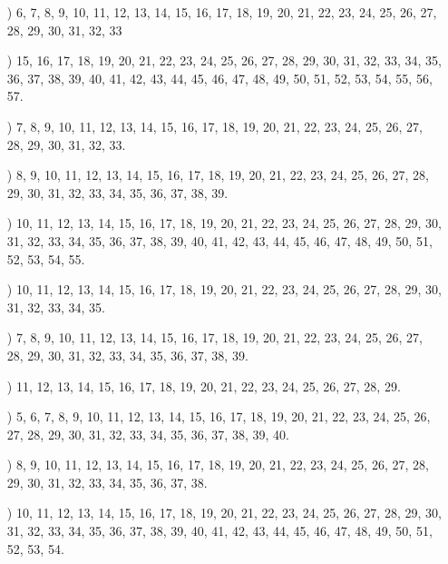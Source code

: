 \documentclass[a4paper,11pt]{article}
\numberwithin{equation}{section}
\begin{document}
\begin{itemize}
\item[ \romannumeral18)] 6, 7, 8, 9, 10, 11, 12, 13, 14, 15, 16, 17, 18, 19,
  20, 21, 22, 23, 24, 25, 26, 27, 28, 29, 30, 31, 32, 33

\item[\romannumeral19)] 15, 16, 17, 18, 19, 20, 21, 22, 23, 24, 25, 26, 27,
  28, 29, 30, 31, 32, 33, 34, 35, 36, 37, 38, 39, 40, 41, 42, 43, 44, 45,
  46, 47, 48, 49, 50, 51, 52, 53, 54, 55, 56, 57.

\item[\romannumeral20)] 7, 8, 9, 10, 11, 12, 13, 14, 15, 16, 17, 18, 19, 20,
  21, 22, 23, 24, 25, 26, 27, 28, 29, 30, 31, 32, 33.

\item[\romannumeral21)] 8, 9, 10, 11, 12, 13, 14, 15, 16, 17, 18, 19, 20,
  21, 22, 23, 24, 25, 26, 27, 28, 29, 30, 31, 32, 33, 34, 35, 36, 37, 38, 39.

\item[\romannumeral22)] 10, 11, 12, 13, 14, 15, 16, 17, 18, 19, 20, 21, 22,
  23, 24, 25, 26, 27, 28, 29, 30, 31, 32, 33, 34, 35, 36, 37, 38, 39, 40,
  41, 42, 43, 44, 45, 46, 47, 48, 49, 50, 51, 52, 53, 54, 55.

\item[\romannumeral23)] 10, 11, 12, 13, 14, 15, 16, 17, 18, 19, 20, 21, 22,
  23, 24, 25, 26, 27, 28, 29, 30, 31, 32, 33, 34, 35.

\item[\romannumeral24)] 7, 8, 9, 10, 11, 12, 13, 14, 15, 16, 17, 18, 19, 20,
  21, 22, 23, 24, 25, 26, 27, 28, 29, 30, 31, 32, 33, 34, 35, 36, 37, 38, 39.

\item[\romannumeral25)] 11, 12, 13, 14, 15, 16, 17, 18, 19, 20, 21, 22, 23,
  24, 25, 26, 27, 28, 29.

\item[\romannumeral26)] 5, 6, 7, 8, 9, 10, 11, 12, 13, 14, 15, 16, 17, 18,
  19, 20, 21, 22, 23, 24, 25, 26, 27, 28, 29, 30, 31, 32, 33, 34, 35, 36,
  37, 38, 39, 40.

\item[\romannumeral30)] 8, 9, 10, 11, 12, 13, 14, 15, 16, 17, 18, 19, 20,
  21, 22, 23, 24, 25, 26, 27, 28, 29, 30, 31, 32, 33, 34, 35, 36, 37, 38.

\item[\romannumeral31)] 10, 11, 12, 13, 14, 15, 16, 17, 18, 19, 20, 21, 22,
  23, 24, 25, 26, 27, 28, 29, 30, 31, 32, 33, 34, 35, 36, 37, 38, 39, 40,
  41, 42, 43, 44, 45, 46, 47, 48, 49, 50, 51, 52, 53, 54.


\end{itemize}
\end{document}
